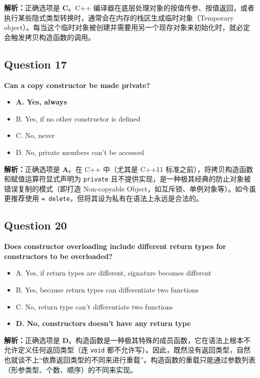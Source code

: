 \documentclass[11pt, a4paper]{article}
\begin{document}
\textbf{解析：}正确选项是 \textbf{C}。C++ 编译器在底层处理对象的按值传参、按值返回，或者执行某些隐式类型转换时，通常会在内存的栈区生成临时对象（Temporary object）。每当这个临时对象被创建并需要用另一个现存对象来初始化时，就必定会触发拷贝构造函数的调用。


\subsection*{Question 17}
\textbf{Can a copy constructor be made private?}
\begin{itemize}
    \item \textbf{A. Yes, always}
    \item B. Yes, if no other constructor is defined
    \item C. No, never
    \item D. No, private members can’t be accessed
\end{itemize}

\textbf{解析：}正确选项是 \textbf{A}。在 C++ 中（尤其是 C++11 标准之前），将拷贝构造函数和赋值运算符显式声明为 \texttt{private} 且不提供实现，是一种极其经典的防止对象被错误复制的模式（即打造 Non-copyable Object，如互斥锁、单例对象等）。如今虽更推荐使用 \texttt{= delete}，但将其设为私有在语法上永远是合法的。


\subsection*{Question 20}
\textbf{Does constructor overloading include different return types for constructors to be overloaded?}
\begin{itemize}
    \item A. Yes, if return types are different, signature becomes different
    \item B. Yes, because return types can differentiate two functions
    \item C. No, return type can’t differentiate two functions
    \item \textbf{D. No, constructors doesn’t have any return type}
\end{itemize}

\textbf{解析：}正确选项是 \textbf{D}。构造函数是一种极其特殊的成员函数，它在语法上根本不允许定义任何返回类型（连 \texttt{void} 都不允许写）。因此，既然没有返回类型，自然也就谈不上“依靠返回类型的不同来进行重载”。构造函数的重载只能通过参数列表（形参类型、个数、顺序）的不同来实现。
\end{document}
